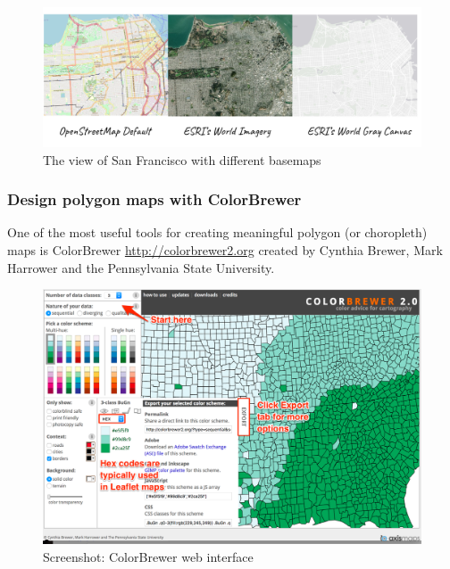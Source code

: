 \documentclass[
  english,
]{book}
\begin{document}
\begin{figure}
\centering
\includegraphics{images/06-map/Map - Baselayers.png}
\caption{The view of San Francisco with different basemaps}
\end{figure}

\hypertarget{design-polygon-maps-with-colorbrewer}{%
\subsubsection*{Design polygon maps with ColorBrewer}\label{design-polygon-maps-with-colorbrewer}}

One of the most useful tools for creating meaningful polygon (or choropleth) maps is ColorBrewer \url{http://colorbrewer2.org} created by Cynthia Brewer, Mark Harrower and the Pennsylvania State University.

\begin{figure}
\centering
\includegraphics{images/06-map/colorbrewer.png}
\caption{Screenshot: ColorBrewer web interface}
\end{figure}
\end{document}
